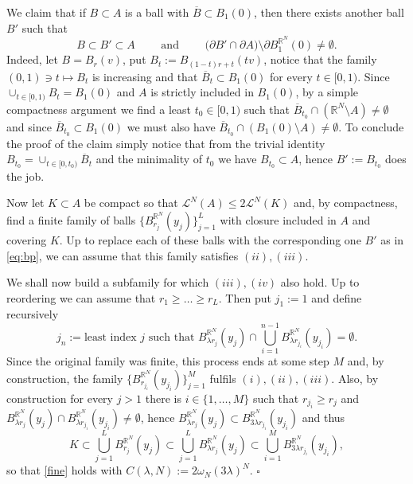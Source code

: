 \documentclass[reqno,11pt]{article}
\numberwithin{equation}{section}
\newcommand{\R}{\mathbb{R}}
\renewenvironment{proof}{\removelastskip\par\medskip   %
\noindent{\em Proof} \rm}{\penalty-20\null\hfill$\square$\par\medbreak}
\begin{document}
\begin{proof} We claim that if $B\subset A$ is a ball with $\overline B\subset B_1(0)$, then there exists another ball $B'$ such that
\begin{equation}
\label{eq:bp}
B\subset B'\subset A\qquad\text{ and }\qquad \big(\partial {B'}\cap\partial A\big)\setminus\partial B_1^{\R^N}(0)\ne \emptyset.
\end{equation}
Indeed, let $B=B_r(v)$, put $B_t:=B_{(1-t)r+t}(tv)$, notice that the family $(0,1)\ni t\mapsto B_t$ is increasing and that $\overline B_t\subset B_1(0)$ for every $t\in[0,1)$. Since $\cup_{t\in[0,1)}B_t=B_1(0)$ and $A$ is strictly included in $B_1(0)$,  by a simple compactness argument we find a least $t_0\in[0,1)$ such that $\overline B_{t_0}\cap (\R^N\setminus A)\neq\emptyset$ and since $\overline B_{t_0}\subset B_1(0)$ we must also have $\overline B_{t_0}\cap (B_1(0)\setminus A)\neq\emptyset$. To conclude the proof of the claim simply notice that from the trivial identity $B_{t_0}=\cup_{t\in[0,t_0)}\overline B_t$ and the minimality of $t_0$ we have $B_{t_0}\subset A$, hence $B':=B_{t_0}$ does the job. 

Now let $K\subset A$ be compact so that $\mathcal L^N(A)\leq 2\mathcal L^N(K)$ and, by compactness, find a finite family of balls $\{B_{r_j}^{\R^N}(y_j)\}_{j=1}^L$ with closure included in $A$ and covering $K$. Up to replace each of these balls with the corresponding one $B'$ as in \eqref{eq:bp}, we can assume  that this family satisfies $(ii),(iii)$.

We shall now build a subfamily for which  $(iii),(iv)$ also hold. Up to reordering we can assume that  $r_1\geq \ldots\geq r_L$.
Then put $j_1:=1$ and define recursively 
\[
j_n:=\text{least index $j$ such that }B_{\lambda r_j}^{\R^N}(y_j)\cap \bigcup_{i=1}^{n-1}B_{\lambda r_{j_i}}^{\R^N}(y_{j_i})=\emptyset.
\]
Since the original family was finite, this process ends at some step $M$ and, by construction, the family $\{B_{r_{j_i}}^{\R^N}(y_{j_i})\}_{j=1}^M$ fulfils $(i),(ii),(iii)$. Also, by construction for every $j>1$ there is $i\in\{1,\ldots,M\}$ such that $r_{j_i}\geq r_j$ and $B_{\lambda r_j}^{\R^N}(y_{j})\cap B_{\lambda r_{j_i}}^{\R^N}(y_{j_i})\neq\emptyset$, hence $B_{\lambda r_j}^{\R^N}(y_{j})\subset B_{3\lambda r_{j_i}}^{\R^N}(y_{j_i})$ and thus
\[
K\subset \bigcup_{j=1}^LB_{r_j}^{\R^N}(y_j)\subset \bigcup_{j=1}^LB_{\lambda r_j}^{\R^N}(y_j)\subset \bigcup_{i=1}^MB_{3\lambda r_{j_i}}^{\R^N}(y_{j_i}),
\]
so that \eqref{fine} holds with $C(\lambda,N):=2\omega_N(3\lambda)^N$.
\end{proof}
\end{document}

